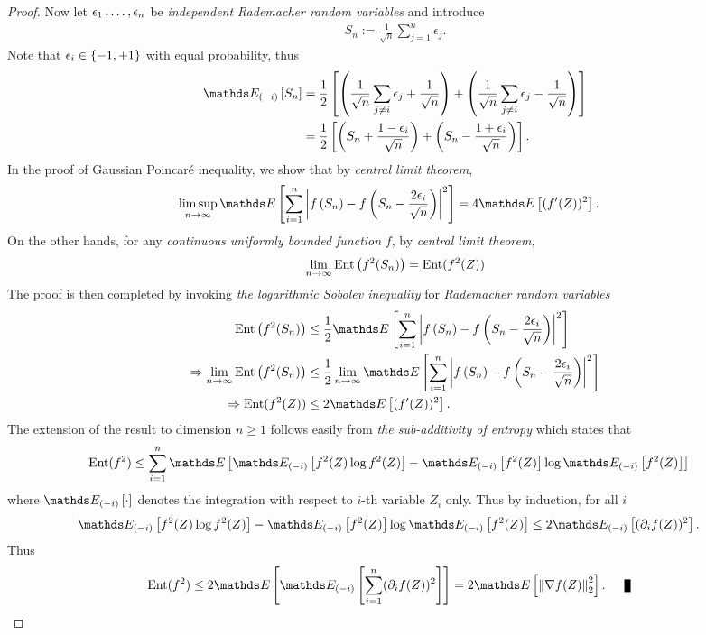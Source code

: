 \documentclass[11pt]{article}
\begin{document}
\begin{itemize}
\begin{proof}
Now let $\epsilon_1 \,{,}\ldots{,}\, \epsilon_n$ be \emph{independent Rademacher random variables} and introduce
\begin{align*}
S_n := \frac{1}{\sqrt{n}}\sum_{j=1}^{n}\epsilon_j.
\end{align*} 
Note that $\epsilon_i \in \left\{-1, +1\right\}$ with equal probability, thus
\begin{align*}
\E{(-i)}{S_n} &= \frac{1}{2}\brac{ \paren{\frac{1}{\sqrt{n}}\sum_{j \neq i}\epsilon_j + \frac{1}{\sqrt{n}}} + \paren{\frac{1}{\sqrt{n}}\sum_{j \neq i}\epsilon_j - \frac{1}{\sqrt{n}}}  } \\
&= \frac{1}{2}\brac{\paren{S_n + \frac{1 - \epsilon_i}{\sqrt{n}}} + \paren{S_n - \frac{1 + \epsilon_i}{\sqrt{n}}}}.
\end{align*} In the proof of Gaussian Poincar{\'e} inequality, we show that by \emph{central limit theorem}, 
\begin{align*}
\limsup\limits_{n\to \infty}\E{}{\sum_{i=1}^{n}\abs{f\paren{S_n}  - f\paren{S_n - \frac{2\epsilon_i}{\sqrt{n}} }}^2}
&= 4\E{}{(f'(Z))^2}. 
\end{align*}
On the other hands, for any \emph{continuous uniformly bounded function} $f$, by \emph{central limit theorem}, 
\begin{align*}
\lim_{n \to \infty}\text{Ent}\left(f^2(S_n)\right) = \text{Ent}(f^2(Z))
\end{align*} The proof is then completed by invoking \emph{the logarithmic Sobolev inequality} for \emph{Rademacher random variables}
\begin{align*}
\text{Ent}\paren{f^2(S_n)} &\le \frac{1}{2}\E{}{\sum_{i=1}^{n}\abs{f\paren{S_n}  - f\paren{S_n - \frac{2\epsilon_i}{\sqrt{n}} }}^2} \\
\Rightarrow  \lim_{n \to \infty}\text{Ent}\paren{f^2(S_n)} &\le \frac{1}{2}\lim_{n \to \infty}\E{}{\sum_{i=1}^{n}\abs{f\paren{S_n}  - f\paren{S_n - \frac{2\epsilon_i}{\sqrt{n}} }}^2} \\
\Rightarrow  \text{Ent}(f^2(Z))&\le 2 \E{}{(f'(Z))^2}.
\end{align*} The extension of the result to dimension $n \ge 1$ follows easily from \emph{the sub-additivity of entropy} which states that
\begin{align*}
\text{Ent}(f^2) &\le \sum_{i=1}^{n}\E{}{\E{(-i)}{f^2(Z)\log f^2(Z)} -\E{(-i)}{f^2(Z)}\log \E{(-i)}{f^2(Z)} } 
\end{align*} where $\E{(-i)}{\cdot}$ denotes the integration with respect to $i$-th variable $Z_i$ only. Thus by induction, for all $i$
\begin{align*}
\E{(-i)}{f^2(Z)\log f^2(Z)} -\E{(-i)}{f^2(Z)}\log \E{(-i)}{f^2(Z)} &\le 2 \E{(-i)}{(\partial_i f(Z))^2}.
\end{align*} Thus
\begin{align*}
\text{Ent}(f^2) &\le 2  \E{}{\E{(-i)}{\sum_{i=1}^{n}(\partial_i f(Z))^2}} = 2\E{}{\norm{\nabla f(Z)}{2}^2}. \qed
\end{align*}
\end{proof}




\end{itemize}
\end{document}
